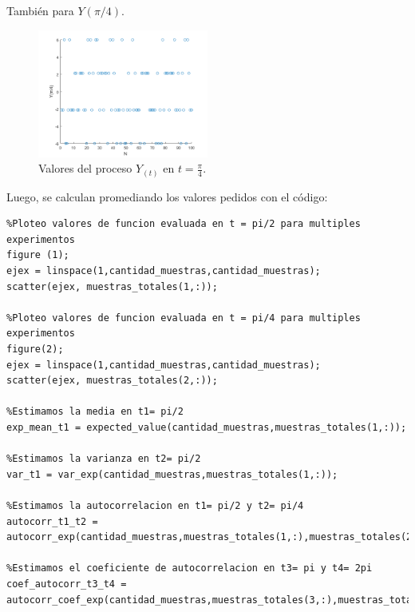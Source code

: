 También para $Y(\pi/4)$.

\begin{figure}[H]
\centering
	\includegraphics[width=0.5\textwidth, trim = {0 0 0 0},clip]{./ImagenesEjercicio1/ypi_4.png}
	\caption{Valores del proceso $Y_(t)$ en $t = \frac{\pi}{4} $.}
	\label{fig:ypi_4}
\end{figure}

Luego, se calculan promediando los valores pedidos con el código:

\begin{lstlisting}
%Ploteo valores de funcion evaluada en t = pi/2 para multiples experimentos
figure (1);
ejex = linspace(1,cantidad_muestras,cantidad_muestras);
scatter(ejex, muestras_totales(1,:));

%Ploteo valores de funcion evaluada en t = pi/4 para multiples experimentos
figure(2);
ejex = linspace(1,cantidad_muestras,cantidad_muestras);
scatter(ejex, muestras_totales(2,:));

%Estimamos la media en t1= pi/2
exp_mean_t1 = expected_value(cantidad_muestras,muestras_totales(1,:));

%Estimamos la varianza en t2= pi/2
var_t1 = var_exp(cantidad_muestras,muestras_totales(1,:));

%Estimamos la autocorrelacion en t1= pi/2 y t2= pi/4
autocorr_t1_t2 = autocorr_exp(cantidad_muestras,muestras_totales(1,:),muestras_totales(2,:));

%Estimamos el coeficiente de autocorrelacion en t3= pi y t4= 2pi
coef_autocorr_t3_t4 = autocorr_coef_exp(cantidad_muestras,muestras_totales(3,:),muestras_totales(4,:));
\end{lstlisting}

